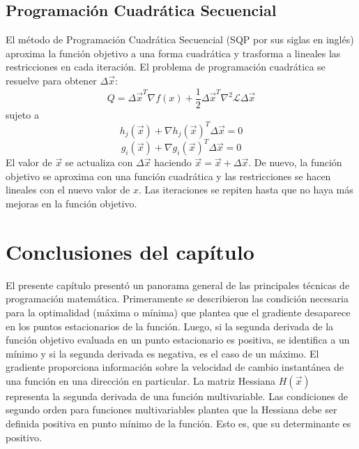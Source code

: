 \subsection{Programación Cuadrática Secuencial}
El método de Programación Cuadrática Secuencial (SQP por sus siglas en inglés) aproxima la función objetivo a una forma cuadrática y trasforma a lineales las restricciones en cada iteración. El problema de programación cuadrática se resuelve para obtener $\Delta \vec{x}$:
\begin{equation}
Q=\Delta \vec{x}^T \nabla f(x)+ \frac{1}{2}\Delta \vec{x}^T \nabla^2 \mathcal{L} \Delta \vec{x}
\end{equation}
sujeto a
\begin{equation}
h_j(\vec{x})+ \nabla h_j(\vec{x})^T \Delta \vec{x}=0
\end{equation}
\begin{equation}
g_i(\vec{x})+ \nabla g_i(\vec{x})^T \Delta \vec{x}=0
\end{equation}
El valor de $\vec{x}$ se actualiza con $\Delta \vec{x}$ haciendo  $\vec{x}=\vec{x}+\Delta \vec{x}$. De nuevo, la función objetivo se aproxima con una función cuadrática y las restricciones se hacen lineales con el nuevo valor de $x$. Las iteraciones se repiten hasta que no haya más mejoras en la función objetivo.
\section{Conclusiones del capítulo}
El presente capítulo presentó un panorama general de las principales técnicas de programación matemática. Primeramente se describieron las condición necesaria para la optimalidad (máxima o mínima) que plantea que el gradiente desaparece en los puntos estacionarios de la función. Luego, si la segunda derivada de la función objetivo evaluada en un punto estacionario es positiva, se identifica a un mínimo y si la segunda derivada es negativa, es el caso de un máximo. El gradiente proporciona información sobre la velocidad de cambio instantánea de una función en una dirección en particular. La matriz Hessiana $H(\vec{x})$ representa la segunda derivada de una función multivariable. Las condiciones de segundo orden para funciones multivariables plantea que la Hessiana debe ser definida positiva en punto mínimo de la función. Esto es, que su determinante es positivo.

